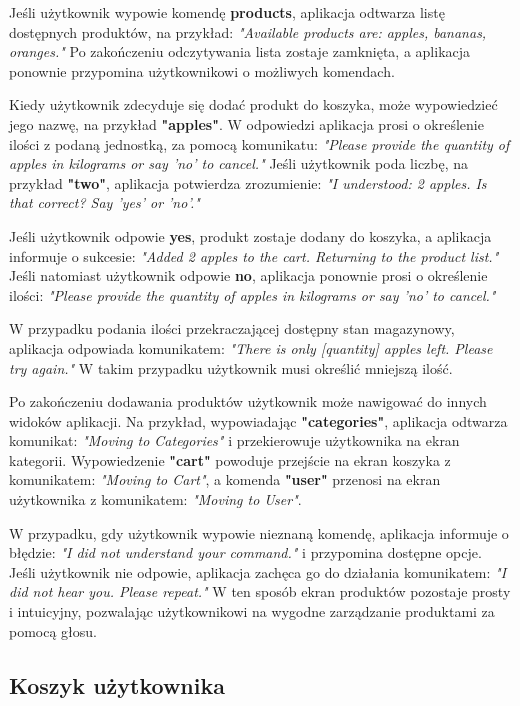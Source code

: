 Jeśli użytkownik wypowie komendę \textbf{products}, aplikacja odtwarza listę dostępnych produktów, na przykład: \textit{"Available products are: apples, bananas, oranges."} Po zakończeniu odczytywania lista zostaje zamknięta, a aplikacja ponownie przypomina użytkownikowi o możliwych komendach.

Kiedy użytkownik zdecyduje się dodać produkt do koszyka, może wypowiedzieć jego nazwę, na przykład \textbf{"apples"}. W odpowiedzi aplikacja prosi o określenie ilości z podaną jednostką, za pomocą komunikatu: \textit{"Please provide the quantity of apples in kilograms or say 'no' to cancel."} Jeśli użytkownik poda liczbę, na przykład \textbf{"two"}, aplikacja potwierdza zrozumienie: \textit{"I understood: 2 apples. Is that correct? Say 'yes' or 'no'."}

Jeśli użytkownik odpowie \textbf{yes}, produkt zostaje dodany do koszyka, a aplikacja informuje o sukcesie: \textit{"Added 2 apples to the cart. Returning to the product list."} Jeśli natomiast użytkownik odpowie \textbf{no}, aplikacja ponownie prosi o określenie ilości: \textit{"Please provide the quantity of apples in kilograms or say 'no' to cancel."}

W przypadku podania ilości przekraczającej dostępny stan magazynowy, aplikacja odpowiada komunikatem: \textit{"There is only [quantity] apples left. Please try again."} W takim przypadku użytkownik musi określić mniejszą ilość.

Po zakończeniu dodawania produktów użytkownik może nawigować do innych widoków aplikacji. Na przykład, wypowiadając \textbf{"categories"}, aplikacja odtwarza komunikat: \textit{"Moving to Categories"} i przekierowuje użytkownika na ekran kategorii. Wypowiedzenie \textbf{"cart"} powoduje przejście na ekran koszyka z komunikatem: \textit{"Moving to Cart"}, a komenda \textbf{"user"} przenosi na ekran użytkownika z komunikatem: \textit{"Moving to User"}.

W przypadku, gdy użytkownik wypowie nieznaną komendę, aplikacja informuje o błędzie: \textit{"I did not understand your command."} i przypomina dostępne opcje. Jeśli użytkownik nie odpowie, aplikacja zachęca go do działania komunikatem: \textit{"I did not hear you. Please repeat."} W ten sposób ekran produktów pozostaje prosty i intuicyjny, pozwalając użytkownikowi na wygodne zarządzanie produktami za pomocą głosu.

\subsection{Koszyk użytkownika}

